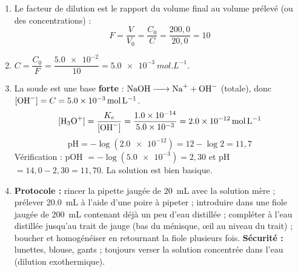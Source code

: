 \documentclass[11pt]{article}
\begin{document}
\begin{corrige}
\begin{enumerate}
    \item Le facteur de dilution est le rapport du volume final au volume prélevé (ou des concentrations) :
    \[ F = \frac{V}{V_0} = \frac{C_0}{C} = \frac{200{,}0}{20{,}0} = 10 \]
    \item $C = \dfrac{C_0}{F} = \dfrac{\num{5,0e-2}}{10} = \SI{5,0e-3}{mol.L^{-1}}$.
    \item La soude est une base \textbf{forte} : $\ce{NaOH -> Na+ + OH-}$ (totale), donc $[\ce{OH-}] = C = \SI{5,0e-3}{mol.L^{-1}}$.
    \[ [\ce{H3O+}] = \frac{K_e}{[\ce{OH-}]} = \frac{\num{1,0e-14}}{\num{5,0e-3}} = \SI{2,0e-12}{mol.L^{-1}} \]
    \[ \text{pH} = -\log(\num{2,0e-12}) = 12 - \log 2 = 11{,}7 \]
    Vérification : pOH $= -\log(\num{5,0e-3}) = 2{,}30$ et pH $= 14{,}0 - 2{,}30 = 11{,}70$. La solution est bien basique.
    \item \textbf{Protocole :} rincer la pipette jaugée de \SI{20}{mL} avec la solution mère ; prélever \SI{20,0}{mL} à l'aide d'une poire à pipeter ; introduire dans une fiole jaugée de \SI{200}{mL} contenant déjà un peu d'eau distillée ; compléter à l'eau distillée jusqu'au trait de jauge (bas du ménisque, œil au niveau du trait) ; boucher et homogénéiser en retournant la fiole plusieurs fois. \textbf{Sécurité :} lunettes, blouse, gants ; toujours verser la solution concentrée dans l'eau (dilution exothermique).
\end{enumerate}
\end{corrige}
\end{document}
